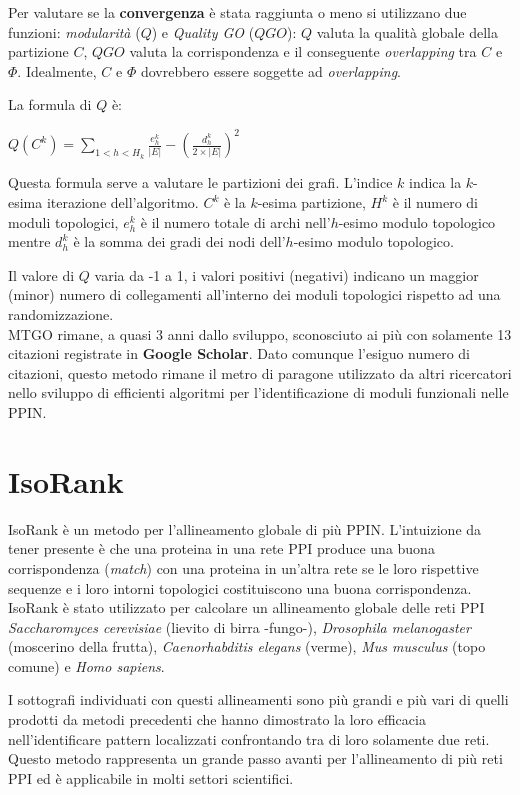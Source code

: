 \documentclass[11pt]{article}
\begin{document}
Per valutare se la \textbf{convergenza} è stata raggiunta o meno si utilizzano due funzioni: \textit{modularità} ($Q$) e \textit{Quality GO} ($QGO$): $Q$ valuta la qualità globale della partizione $C$, $QGO$ valuta la corrispondenza e il conseguente \textit{overlapping} tra $C$ e $\Phi$. Idealmente, $C$ e $\Phi$ dovrebbero essere soggette ad \textit{overlapping}.

La formula di $Q$ è:

\begin{center}
$Q(C^k) = \displaystyle{\sum_{1<h<H_k}\frac{e^k_h}{|E|} - \left(\frac{d^k_h}{2 \times |E|}\right)^2}$
\end{center}

Questa formula serve a valutare le partizioni dei grafi. L'indice $k$ indica la $k$-esima iterazione dell'algoritmo. $C^k$ è la $k$-esima partizione, $H^k$ è il numero di moduli topologici, $e^k_h$ è il numero totale di archi nell'$h$-esimo modulo topologico mentre $d^k_h$ è la somma dei gradi dei nodi dell'$h$-esimo modulo topologico. 

Il valore di $Q$ varia da -1 a 1, i valori positivi (negativi) indicano un maggior (minor) numero di collegamenti all'interno dei moduli topologici rispetto ad una randomizzazione.\\

MTGO rimane, a quasi 3 anni dallo sviluppo, sconosciuto ai più con solamente 13 citazioni registrate in \textbf{Google Scholar}. Dato comunque l'esiguo numero di citazioni, questo metodo rimane il metro di paragone utilizzato da altri ricercatori nello sviluppo di efficienti algoritmi per l'identificazione di moduli funzionali nelle PPIN.

\pagebreak
\section{IsoRank}
IsoRank è un metodo per l'allineamento globale di più PPIN. L'intuizione da tener presente è che una proteina in una rete PPI produce una buona corrispondenza (\textit{match}) con una proteina in un'altra rete se le loro rispettive sequenze e i loro intorni topologici costituiscono una buona corrispondenza. IsoRank è stato utilizzato per calcolare un allineamento globale delle reti PPI \textit{Saccharomyces cerevisiae} (lievito di birra -fungo-), \textit{Drosophila melanogaster} (moscerino della frutta), \textit{Caenorhabditis elegans} (verme), \textit{Mus musculus} (topo comune) e \textit{Homo sapiens}.

I sottografi individuati con questi allineamenti sono più grandi e più vari di quelli prodotti da metodi precedenti che hanno dimostrato la loro efficacia nell'identificare pattern localizzati confrontando tra di loro solamente due reti. Questo metodo rappresenta un grande passo avanti per l'allineamento di più reti PPI ed è applicabile in molti settori scientifici.
\end{document}
